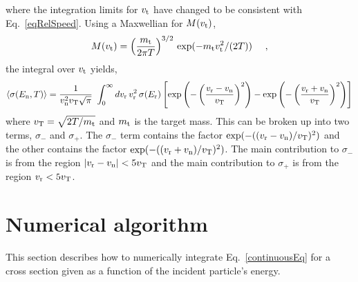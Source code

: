 \documentclass[11pt,twoside]{article}
\begin{document}
where the integration limits for $v_{\rm t}$ have changed to be consistent with Eq.~\ref{eqRelSpeed}.
Using a Maxwellian for $M(v_{\rm t})$,
\begin{equation}
    M(v_{\rm t}) = \left({ m_{\rm t} \over 2 \pi T }\right)^{3/2} \, \exp( - m_{\rm t} v_{\rm t}^2 / ( 2 T ) ) \ \ \ \ ,
\end{equation}
the integral over $v_{\rm t}$ yields,
\begin{equation}	\label{continuousEq}
    \left<\sigma(E_{\rm n},T)\right> = { 1 \over v_{\rm n}^2 v_{\rm T} \sqrt{\pi} } \ \int_0^\infty dv_{\rm r} \,
        v_{\rm r}^2 \, \sigma(E_{\rm r}) \left[ \exp\left( -\left( { v_{\rm r} - v_{\rm n} \over v_{\rm T} } \right)^2 \right)
        - \exp\left( -\left( { v_{\rm r} + v_{\rm n} \over v_{\rm T } } \right)^2 \right) \right]
\end{equation}
where $v_{\rm T} = \sqrt{2T / m_{\rm t}}$ and $m_{\rm t}$ is the target mass.
This can be broken up into two terms, $\sigma_-$ and $\sigma_+$. The $\sigma_-$ term contains the factor
$\exp( -( ( v_{\rm r} - v_{\rm n} ) / v_{\rm T } )^2 )$
and the other contains the factor $\exp( -( ( v_{\rm r} + v_{\rm n} ) / v_{\rm T } )^2 )$.
The main contribution to $\sigma_-$ is from the region $ | v_{\rm r} - v_{\rm n} | < 5 v_{\rm T }$ and
the main contribution to $\sigma_+$ is from the region $ v_{\rm r} < 5 v_{\rm T }$.

\section{Numerical algorithm}

This section describes how to numerically integrate Eq.~\ref{continuousEq}
for a cross section given as a function of the incident particle's energy.
\end{document}
